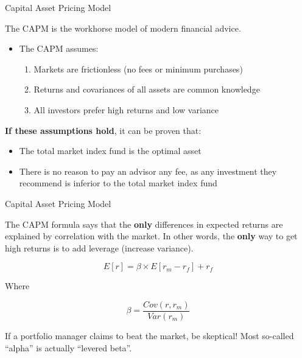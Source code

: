 \documentclass[aspectratio=169]{beamer}
\begin{document}
\begin{frame}{Capital Asset Pricing Model}

The CAPM is the workhorse model of modern financial advice.  

\begin{itemize}
    \item The CAPM assumes:
    \begin{enumerate}
        \item Markets are frictionless (no fees or minimum purchases)  
        \item Returns and covariances of all assets are common knowledge 
        \item All investors prefer high returns and low variance 
    \end{enumerate}
\end{itemize}

\textbf{If these assumptions hold}, it can be proven that: 
\begin{itemize}
    \item The total market index fund is the optimal asset
    \item There is no reason to pay an advisor any fee, as any investment they recommend is inferior to the total market index fund 
\end{itemize}



    
\end{frame}

\begin{frame}{Capital Asset Pricing Model}

 The CAPM formula says that the \textbf{only} differences in expected returns are explained by correlation with the market. 
 \vfill 
 In other words, the \textbf{only} way to get high returns is to add leverage (increase variance). 

$$E[r]= \beta\times E[r_m-r_f]+r_f$$

Where 

$$\beta = \frac{Cov(r,r_m)}{Var(r_m)}$$

\vfill 

If a portfolio manager claims to beat the market, be skeptical! Most so-called ``alpha'' is actually ``levered beta''. 

\end{frame}
\end{document}
